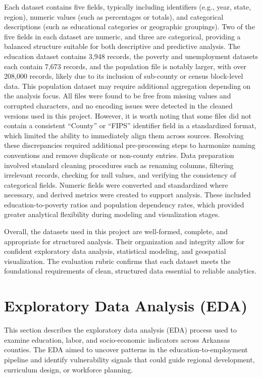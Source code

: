 \documentclass{llncs}
\begin{document}
Each dataset contains five fields, typically including identifiers (e.g., year, state, region), numeric values (such as percentages or totals), and categorical descriptions (such as educational categories or geographic groupings). Two of the five fields in each dataset are numeric, and three are categorical, providing a balanced structure suitable for both descriptive and predictive analysis. The education dataset contains 3,948 records, the poverty and unemployment datasets each contain 7,673 records, and the population file is notably larger, with over 208,000 records, likely due to its inclusion of sub-county or census block-level data. This population dataset may require additional aggregation depending on the analysis focus.
All files were found to be free from missing values and corrupted characters, and no encoding issues were detected in the cleaned versions used in this project. However, it is worth noting that some files did not contain a consistent “County” or “FIPS” identifier field in a standardized format, which limited the ability to immediately align them across sources. Resolving these discrepancies required additional pre-processing steps to harmonize naming conventions and remove duplicate or non-county entries.
Data preparation involved standard cleaning procedures such as renaming columns, filtering irrelevant records, checking for null values, and verifying the consistency of categorical fields. Numeric fields were converted and standardized where necessary, and derived metrics were created to support analysis. These included education-to-poverty ratios and population dependency rates, which provided greater analytical flexibility during modeling and visualization stages.

\FloatBarrier

Overall, the datasets used in this project are well-formed, complete, and appropriate for structured analysis. Their organization and integrity allow for confident exploratory data analysis, statistical modeling, and geospatial visualization. The evaluation rubric confirms that each dataset meets the foundational requirements of clean, structured data essential to reliable analytics.

\section{Exploratory Data Analysis (EDA)}

This section describes the exploratory data analysis (EDA) process used to examine education, labor, and socio-economic indicators across Arkansas counties. The EDA aimed to uncover patterns in the education-to-employment pipeline and identify vulnerability signals that could guide regional development, curriculum design, or workforce planning.
\end{document}
